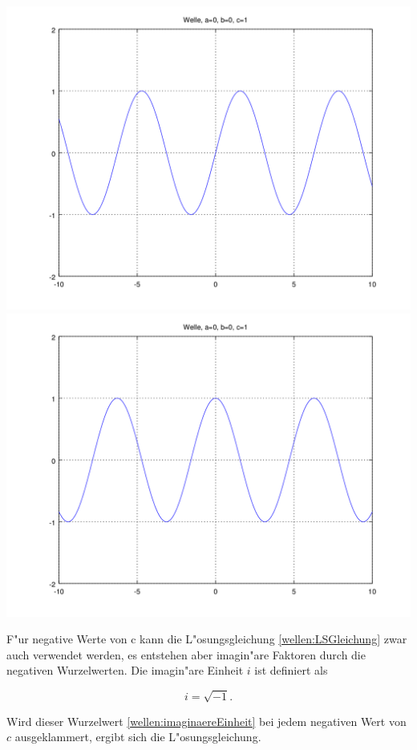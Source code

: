 \noindent
\includegraphics[scale=0.35]{./wellen/images/basicfunctions/sin.png}
\includegraphics[scale=0.35]{./wellen/images/basicfunctions/cos.png}

F"ur negative Werte von c kann die L"osungsgleichung \ref{wellen:LSGleichung} 
zwar auch verwendet werden, es entstehen aber imagin"are Faktoren durch die 
negativen Wurzelwerten. Die imagin"are Einheit $i$ ist definiert als

\begin{equation}
	i = \sqrt{-1}.
	\label{wellen:imaginaereEinheit}
\end{equation}

Wird dieser Wurzelwert \ref{wellen:imaginaereEinheit} bei jedem negativen Wert 
von $c$ ausgeklammert, ergibt sich die L"osungsgleichung.

